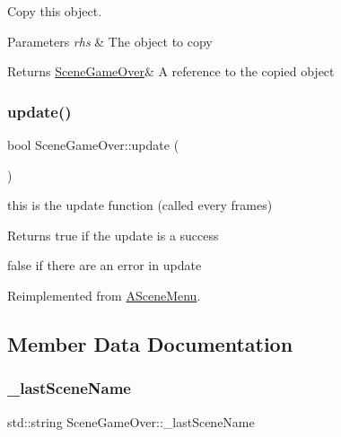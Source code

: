 Copy this object. 


\begin{DoxyParams}{Parameters}
{\em rhs} & The object to copy \\
\hline
\end{DoxyParams}
\begin{DoxyReturn}{Returns}
\hyperlink{class_scene_game_over}{Scene\+Game\+Over}\& A reference to the copied object 
\end{DoxyReturn}
\mbox{\label{class_scene_game_over_ac4547b0ed87f3c324e75dafb8f96b5af}} 
\subsubsection{\texorpdfstring{update()}{update()}}
{\footnotesize\ttfamily bool Scene\+Game\+Over\+::update (\begin{DoxyParamCaption}{ }\end{DoxyParamCaption})\hspace{0.3cm}{\ttfamily [virtual]}}



this is the update function (called every frames) 

\begin{DoxyReturn}{Returns}
true if the update is a success 

false if there are an error in update 
\end{DoxyReturn}


Reimplemented from \hyperlink{class_a_scene_menu_a1deeb5fd9be97376998cd2af36f29744}{A\+Scene\+Menu}.



\subsection{Member Data Documentation}
\mbox{\label{class_scene_game_over_abf015c1667f14f83adcd22f5ccdbb360}} 
\subsubsection{\texorpdfstring{\+\_\+last\+Scene\+Name}{\_lastSceneName}}
{\footnotesize\ttfamily std\+::string Scene\+Game\+Over\+::\+\_\+last\+Scene\+Name\hspace{0.3cm}{\ttfamily [protected]}}

